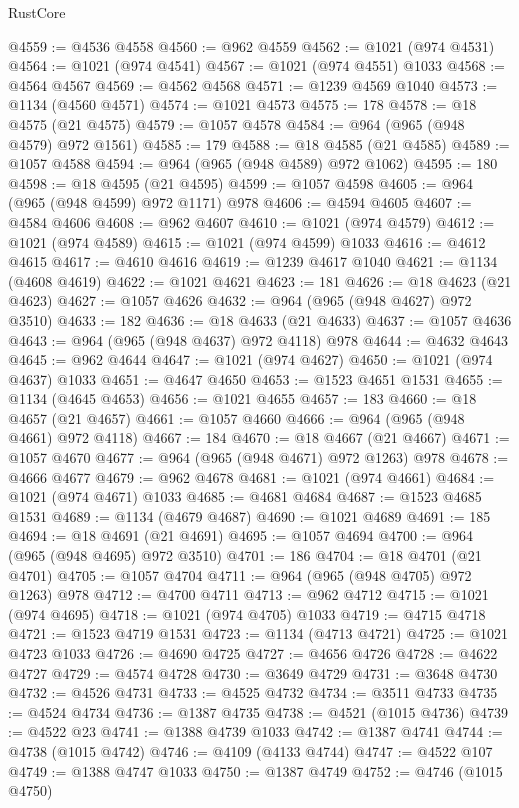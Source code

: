 \begin{lexlean}{RustCore}
\begin{coremodule}
@4559 := @4536 @4558
@4560 := @962 @4559
@4562 := @1021 (@974 @4531)
@4564 := @1021 (@974 @4541)
@4567 := @1021 (@974 @4551) @1033
@4568 := @4564 @4567
@4569 := @4562 @4568
@4571 := @1239 @4569 @1040
@4573 := @1134 (@4560 @4571)
@4574 := @1021 @4573
@4575 := 178
@4578 := @18 @4575 (@21 @4575)
@4579 := @1057 @4578
@4584 := @964 (@965 (@948 @4579) @972 @1561)
@4585 := 179
@4588 := @18 @4585 (@21 @4585)
@4589 := @1057 @4588
@4594 := @964 (@965 (@948 @4589) @972 @1062)
@4595 := 180
@4598 := @18 @4595 (@21 @4595)
@4599 := @1057 @4598
@4605 := @964 (@965 (@948 @4599) @972 @1171) @978
@4606 := @4594 @4605
@4607 := @4584 @4606
@4608 := @962 @4607
@4610 := @1021 (@974 @4579)
@4612 := @1021 (@974 @4589)
@4615 := @1021 (@974 @4599) @1033
@4616 := @4612 @4615
@4617 := @4610 @4616
@4619 := @1239 @4617 @1040
@4621 := @1134 (@4608 @4619)
@4622 := @1021 @4621
@4623 := 181
@4626 := @18 @4623 (@21 @4623)
@4627 := @1057 @4626
@4632 := @964 (@965 (@948 @4627) @972 @3510)
@4633 := 182
@4636 := @18 @4633 (@21 @4633)
@4637 := @1057 @4636
@4643 := @964 (@965 (@948 @4637) @972 @4118) @978
@4644 := @4632 @4643
@4645 := @962 @4644
@4647 := @1021 (@974 @4627)
@4650 := @1021 (@974 @4637) @1033
@4651 := @4647 @4650
@4653 := @1523 @4651 @1531
@4655 := @1134 (@4645 @4653)
@4656 := @1021 @4655
@4657 := 183
@4660 := @18 @4657 (@21 @4657)
@4661 := @1057 @4660
@4666 := @964 (@965 (@948 @4661) @972 @4118)
@4667 := 184
@4670 := @18 @4667 (@21 @4667)
@4671 := @1057 @4670
@4677 := @964 (@965 (@948 @4671) @972 @1263) @978
@4678 := @4666 @4677
@4679 := @962 @4678
@4681 := @1021 (@974 @4661)
@4684 := @1021 (@974 @4671) @1033
@4685 := @4681 @4684
@4687 := @1523 @4685 @1531
@4689 := @1134 (@4679 @4687)
@4690 := @1021 @4689
@4691 := 185
@4694 := @18 @4691 (@21 @4691)
@4695 := @1057 @4694
@4700 := @964 (@965 (@948 @4695) @972 @3510)
@4701 := 186
@4704 := @18 @4701 (@21 @4701)
@4705 := @1057 @4704
@4711 := @964 (@965 (@948 @4705) @972 @1263) @978
@4712 := @4700 @4711
@4713 := @962 @4712
@4715 := @1021 (@974 @4695)
@4718 := @1021 (@974 @4705) @1033
@4719 := @4715 @4718
@4721 := @1523 @4719 @1531
@4723 := @1134 (@4713 @4721)
@4725 := @1021 @4723 @1033
@4726 := @4690 @4725
@4727 := @4656 @4726
@4728 := @4622 @4727
@4729 := @4574 @4728
@4730 := @3649 @4729
@4731 := @3648 @4730
@4732 := @4526 @4731
@4733 := @4525 @4732
@4734 := @3511 @4733
@4735 := @4524 @4734
@4736 := @1387 @4735
@4738 := @4521 (@1015 @4736)
@4739 := @4522 @23
@4741 := @1388 @4739 @1033
@4742 := @1387 @4741
@4744 := @4738 (@1015 @4742)
@4746 := @4109 (@4133 @4744)
@4747 := @4522 @107
@4749 := @1388 @4747 @1033
@4750 := @1387 @4749
@4752 := @4746 (@1015 @4750)

\end{coremodule}
\end{lexlean}
